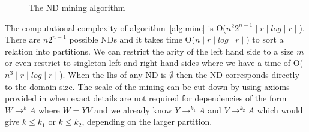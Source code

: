 {\renewcommand{\baselinestretch}{1}
\begin{figure}[ht]
\begin{center}
\end{center}
\caption{\label{numdep:fig:nd_mine} The ND mining algorithm}
\end{figure}
}

The computational complexity of algorithm~\ref{alg:mine} is O($n^2 2^{n-1}
\mid r \mid log \mid r \mid$). There are $n2^{n-1}$ possible NDs and
it takes time O($n \mid r \mid log \mid r \mid$) to sort a relation into
partitions. We can restrict the arity of the left hand side to a size
$m$ or even restrict to singleton left and right
hand sides where we have a time of O($n^3\mid r \mid log \mid r \mid$).
When the lhs of any ND is $\emptyset$ then the ND corresponds
directly to the domain size.
The scale of the mining can be cut down by using axioms provided
in \cite{gm85b,gm85a} when exact details are not required for
dependencies of the form $W \to^k A$ where $W = YV$ and we already
know $Y \to^{k_1} A$ and $V \to^{k_2} A$ which would give $k \le k_1$
or $k \le k_2$, depending on the larger partition. 

